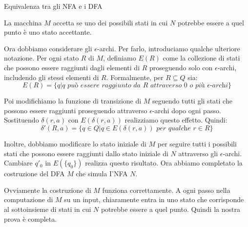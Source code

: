 \begin{Thm}{Equivalenza tra gli NFA e i DFA}{}
\begin{demonstration}
\begin{enumerate}
    La macchina $M$ accetta se uno dei possibili stati in cui $N$ potrebbe essere a quel punto è uno stato accettante.
\end{enumerate}

Ora dobbiamo considerare gli $\epsilon$-archi. Per farlo, introduciamo qualche ulteriore notazione. Per ogni stato $R$ di $M$, definiamo $E(R)$ come la collezione di stati che possono essere raggiunti dagli elementi di $R$ proseguendo solo con $\epsilon$-archi, includendo gli stessi elementi di $R$. Formalmente, per $R\subseteq Q$ sia:
\begin{equation*}
    E(R) =\{ q|q \textit{ può essere raggiunto da } R \textit{ attraverso } 0 \textit{ o più } \epsilon\textit{-archi}\}
\end{equation*}

Poi modifichiamo la funzione di transizione di $M$ seguendo tutti gli stati che possono essere raggiunti proseguendo attraverso $\epsilon$-archi dopo ogni passo. Sostituendo $\delta(r, a)$ con $E(\delta(r, a))$ realizziamo questo effetto. Quindi:
\begin{equation*}
    \delta'(R, a) = \{q \in Q | q \in E(\delta(r, a)) \textit{ per qualche } r \in R\}
\end{equation*}

Inoltre, dobbiamo modificare lo stato iniziale di $M$ per seguire tutti i possibili stati che possono essere raggiunti dallo stato iniziale di $N$ attraverso gli $\epsilon$-archi. Cambiare $q'_0$ in $E(\{q_{0}\})$ realizza questo risultato. Ora abbiamo completato la costruzione del DFA $M$ che simula I'NFA $N$.

Ovviamente la costruzione di $M$ funziona correttamente. A ogni passo nella computazione di $M$ su un input, chiaramente entra in uno stato che corrisponde al sottoinsieme di stati in cui $N$ potrebbe essere a quel punto. Quindi la nostra prova è completa.
\end{demonstration}  
\end{Thm}

